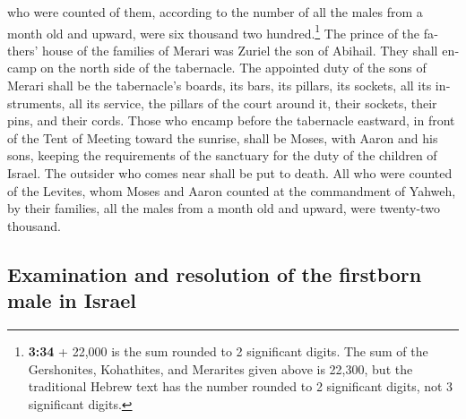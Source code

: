 \begin{paracol}{2}
\begin{otherlanguage}{english}
who were counted of them, according to the number of all the males from
a month old and upward, were six thousand two hundred.\footnote{\textbf{3:34}
  + 22,000 is the sum rounded to 2 significant digits. The sum of the
  Gershonites, Kohathites, and Merarites given above is 22,300, but the
  traditional Hebrew text has the number rounded to 2 significant
  digits, not 3 significant digits.}  The prince of the
fathers' house of the families of Merari was Zuriel the son of Abihail.
They shall encamp on the north side of the tabernacle. 
The appointed duty of the sons of Merari shall be the tabernacle's
boards, its bars, its pillars, its sockets, all its instruments, all its
service,  the pillars of the court around it, their
sockets, their pins, and their cords.  Those who encamp
before the tabernacle eastward, in front of the Tent of Meeting toward
the sunrise, shall be Moses, with Aaron and his sons, keeping the
requirements of the sanctuary for the duty of the children of Israel.
The outsider who comes near shall be put to death.  All
who were counted of the Levites, whom Moses and Aaron counted at the
commandment of Yahweh, by their families, all the males from a month old
and upward, were twenty-two thousand.

\hypertarget{examination-and-resolution-of-the-firstborn-male-in-israel}{%
\subsection{Examination and resolution of the firstborn male in
Israel}\label{examination-and-resolution-of-the-firstborn-male-in-israel}}


\end{otherlanguage}
\end{paracol}

